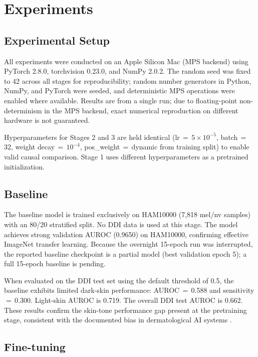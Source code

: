 \section{Experiments}

\subsection{Experimental Setup}

All experiments were conducted on an Apple Silicon Mac (MPS backend) using PyTorch 2.8.0, torchvision 0.23.0, and NumPy 2.0.2. The random seed was fixed to 42 across all stages for reproducibility; random number generators in Python, NumPy, and PyTorch were seeded, and deterministic MPS operations were enabled where available. Results are from a single run; due to floating-point non-determinism in the MPS backend, exact numerical reproduction on different hardware is not guaranteed.

Hyperparameters for Stages 2 and 3 are held identical (lr\,$=$\,$5{\times}10^{-5}$, batch\,$=$\,32, weight decay\,$=$\,$10^{-4}$, pos\_weight\,$=$\,dynamic from training split) to enable valid causal comparison. Stage 1 uses different hyperparameters as a pretrained initialization.

\subsection{Baseline}

The baseline model is trained exclusively on HAM10000 (7,818 mel/nv samples) with an 80/20 stratified split. No DDI data is used at this stage. The model achieves strong validation AUROC (0.9650) on HAM10000, confirming effective ImageNet transfer learning. Because the overnight 15-epoch run was interrupted, the reported baseline checkpoint is a partial model (best validation epoch 5); a full 15-epoch baseline is pending.

When evaluated on the DDI test set using the default threshold of 0.5, the baseline exhibits limited dark-skin performance: AUROC\,$=$\,0.588 and sensitivity\,$=$\,0.300. Light-skin AUROC is 0.719. The overall DDI test AUROC is 0.662. These results confirm the skin-tone performance gap present at the pretraining stage, consistent with the documented bias in dermatological AI systems \cite{Daneshjou2022, Groh2021}.

\subsection{Fine-tuning}

